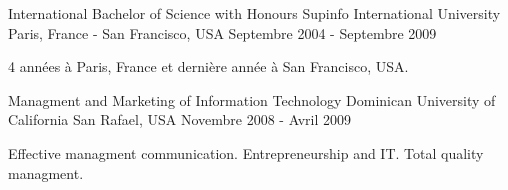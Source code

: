

\begin{cventries}

    \cventry
    {International Bachelor of Science with Honours} %
    {Supinfo International University} %
    {Paris, France - San Francisco, USA} %
    {Septembre 2004 - Septembre 2009} %
    {
    \begin{cvitems} %
        \item {4 années à Paris, France et dernière année à San Francisco, USA.}
    \end{cvitems}
    }

    \cventry
    {Managment and Marketing of Information Technology} %
    {Dominican University of California} %
    {San Rafael, USA} %
    {Novembre 2008 - Avril 2009} %
    {
    \begin{cvitems} %
        \item {Effective managment communication. Entrepreneurship and IT. Total quality managment.}
    \end{cvitems}
    }

\end{cventries}
